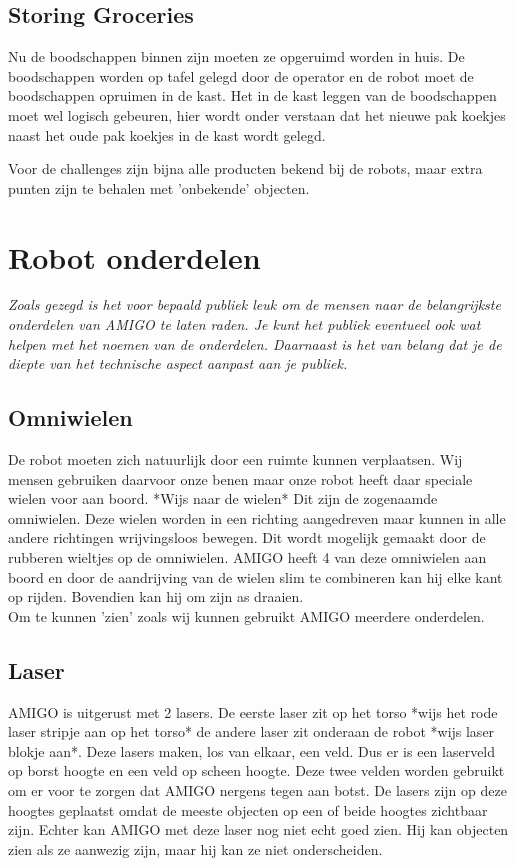 \documentclass[a4paper,10pt]{article}
\numberwithin{equation}{section}
\numberwithin{figure}{section}
\numberwithin{table}{section}
\begin{document}
\subsection*{Storing Groceries}
Nu de boodschappen binnen zijn moeten ze opgeruimd worden in huis. De boodschappen worden op tafel gelegd door de operator en de robot moet de boodschappen opruimen in de kast. Het in de kast leggen van de boodschappen moet wel logisch gebeuren, hier wordt onder verstaan dat het nieuwe pak koekjes naast het oude pak koekjes in de kast wordt gelegd.\

Voor de challenges zijn bijna alle producten bekend bij de robots, maar extra punten zijn te behalen met 'onbekende' objecten.  

\section*{Robot onderdelen}
\textit{Zoals gezegd is het voor bepaald publiek leuk om de mensen naar de belangrijkste onderdelen van AMIGO te laten raden. Je kunt het publiek eventueel ook wat helpen met het noemen van de onderdelen. Daarnaast is het van belang dat je de diepte van het technische aspect aanpast aan je publiek.}\\

\subsection*{Omniwielen}
De robot moeten zich natuurlijk door een ruimte kunnen verplaatsen. Wij mensen gebruiken daarvoor onze benen maar onze robot heeft daar speciale wielen voor aan boord. *Wijs naar de wielen* Dit zijn de zogenaamde omniwielen. Deze wielen worden in een richting aangedreven maar kunnen in alle andere richtingen wrijvingsloos bewegen. Dit wordt mogelijk gemaakt door de rubberen wieltjes op de omniwielen. AMIGO heeft 4 van deze omniwielen aan boord en door de aandrijving van de wielen slim te combineren kan hij elke kant op rijden. Bovendien kan hij om zijn as draaien. \\


Om te kunnen 'zien' zoals wij kunnen gebruikt AMIGO meerdere onderdelen.
\subsection*{Laser}
AMIGO is uitgerust met 2 lasers. De eerste laser zit op het torso *wijs het rode laser stripje aan op het torso* de andere laser zit onderaan de robot *wijs laser blokje aan*. Deze lasers maken, los van elkaar, een veld. Dus er is een laserveld op borst hoogte en een veld op scheen hoogte. Deze twee velden worden gebruikt om er voor te zorgen dat AMIGO nergens tegen aan botst. De lasers zijn op deze hoogtes geplaatst omdat de meeste objecten op een of beide hoogtes zichtbaar zijn. Echter kan AMIGO met deze laser nog niet echt goed zien. Hij kan objecten zien als ze aanwezig zijn, maar hij kan ze niet onderscheiden.
\end{document}
